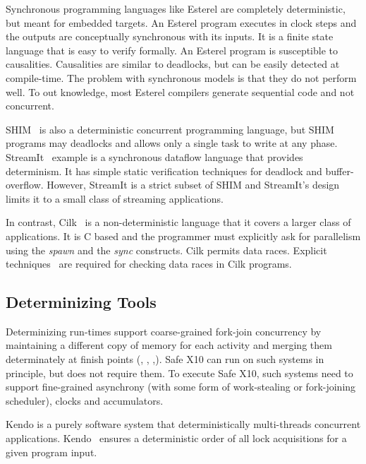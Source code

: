 Synchronous programming languages like Esterel are completely
deterministic, but meant for embedded targets. An Esterel program
executes in clock steps and the outputs are conceptually synchronous
with its inputs.  It is a finite state language that is easy to verify
formally. An Esterel program is susceptible to
causalities. Causalities are similar to deadlocks, but can be easily
detected at compile-time.  The problem with synchronous models is that
they do not perform well. To out knowledge, most Esterel compilers
generate sequential code and not concurrent.

SHIM~\cite{edwards2005shim2,tardieu2006scheduling-independent} is also
a deterministic concurrent programming language, but SHIM programs may
deadlocks and allows only a single task to write at any
phase. StreamIt~\cite{thies2001streamit} example is a synchronous
dataflow language that provides determinism. It has simple static
verification techniques for deadlock and buffer-overflow.  However,
StreamIt is a strict subset of SHIM and StreamIt's design limits it to
a small class of streaming applications.



In contrast,
Cilk~\cite{blumofe1995cilk} is a non-deterministic language that it covers a larger
class of applications. It is C based
and the programmer must explicitly ask for parallelism using
the \emph{spawn} and the \emph{sync} constructs.
Cilk permits data races.
Explicit techniques~\cite{cheng1998detecting} are
required for checking data races in Cilk programs.




\subsection{Determinizing Tools}
Determinizing run-times support coarse-grained fork-join concurrency
by maintaining a different copy of memory for each activity and
merging them determinately at finish points (\cite{grace},
\cite{dmp}, \cite{kendo},\cite{determinator}). Safe
X10 can run on such systems in principle, but does not require them.
To execute Safe X10, such systems need to support fine-grained
asynchrony (with some form of work-stealing or fork-joining
scheduler), clocks and accumulators.

Kendo is a purely software system that deterministically multi-threads
concurrent applications.  Kendo~\cite{olszewski2009kendo} ensures a
deterministic order of all lock acquisitions for a given program
input.

